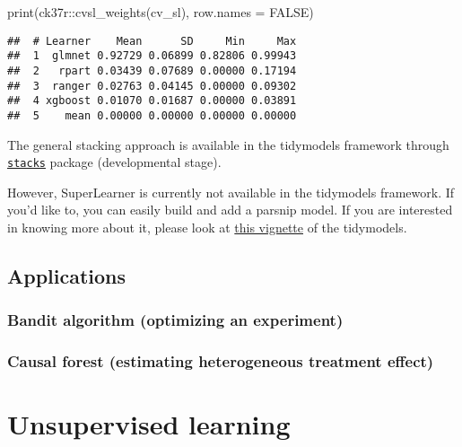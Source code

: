\documentclass[
]{book}
\newenvironment{Shaded}{\begin{snugshade}}{\end{snugshade}}
\newcommand{\AttributeTok}[1]{\textcolor[rgb]{0.77,0.63,0.00}{#1}}
\newcommand{\ConstantTok}[1]{\textcolor[rgb]{0.00,0.00,0.00}{#1}}
\newcommand{\FunctionTok}[1]{\textcolor[rgb]{0.00,0.00,0.00}{#1}}
\newcommand{\NormalTok}[1]{#1}
\newcommand{\SpecialCharTok}[1]{\textcolor[rgb]{0.00,0.00,0.00}{#1}}
\begin{document}
\begin{Shaded}
\begin{Highlighting}[]
\FunctionTok{print}\NormalTok{(ck37r}\SpecialCharTok{::}\FunctionTok{cvsl\_weights}\NormalTok{(cv\_sl), }\AttributeTok{row.names =} \ConstantTok{FALSE}\NormalTok{)}
\end{Highlighting}
\end{Shaded}

\begin{verbatim}
##  # Learner    Mean      SD     Min     Max
##  1  glmnet 0.92729 0.06899 0.82806 0.99943
##  2   rpart 0.03439 0.07689 0.00000 0.17194
##  3  ranger 0.02763 0.04145 0.00000 0.09302
##  4 xgboost 0.01070 0.01687 0.00000 0.03891
##  5    mean 0.00000 0.00000 0.00000 0.00000
\end{verbatim}

The general stacking approach is available in the tidymodels framework through \href{https://github.com/tidymodels/stacks}{\texttt{stacks}} package (developmental stage).

However, SuperLearner is currently not available in the tidymodels framework. If you'd like to, you can easily build and add a parsnip model. If you are interested in knowing more about it, please look at \href{https://www.tidymodels.org/learn/develop/models/}{this vignette} of the tidymodels.

\hypertarget{applications-2}{%
\subsection{Applications}\label{applications-2}}

\hypertarget{bandit-algorithm-optimizing-an-experiment}{%
\subsubsection{Bandit algorithm (optimizing an experiment)}\label{bandit-algorithm-optimizing-an-experiment}}

\hypertarget{causal-forest-estimating-heterogeneous-treatment-effect}{%
\subsubsection{Causal forest (estimating heterogeneous treatment effect)}\label{causal-forest-estimating-heterogeneous-treatment-effect}}

\hypertarget{unsupervised-learning}{%
\section{Unsupervised learning}\label{unsupervised-learning}}
\end{document}
